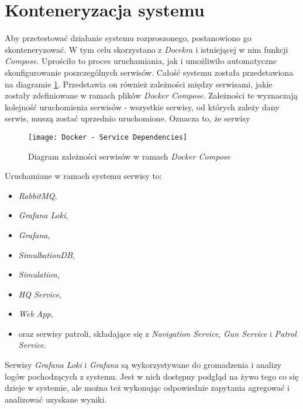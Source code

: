 \section{Konteneryzacja systemu}
\label{sec:konteneryzacjaSystemu}

\par Aby przetestować działanie systemu rozproszonego, postanowiono go skonteneryzować. W tym celu skorzystano z \emph{Docekr}a i istniejącej w nim funkcji \emph{Compose}. Uprościło to proces uruchamiania, jak i umożliwiło automatyczne skonfigurowanie poszczególnych serwisów. Całość systemu została przedstawiona na diagramie \ref{fig:dockerServiceRelations}. Przedstawia on również zależności między serwisami, jakie zostały zdefiniowane w ramach plików \emph{Docker Compose}. Zależności te wyznaczają kolejność uruchomienia serwisów - wszystkie serwisy, od których zależy dany serwis, muszą zostać uprzednio uruchomione. Oznacza to, że serwisy

\begin{figure}
    \centering
    \texttt{[image: Docker - Service Dependencies]}
    \caption{Diagram zależności serwisów w ramach \emph{Docker Compose}}
    \label{fig:dockerServiceRelations}
\end{figure}


\par Uruchamiane w ramach systemu serwisy to:
\begin{itemize}
    \item \emph{RabbitMQ},
    \item \emph{Grafana Loki},
    \item \emph{Grafana},
    \item \emph{SimulbationDB},
    \item \emph{Simulation},
    \item \emph{HQ Service},
    \item \emph{Web App},
    \item oraz serwisy patroli, składające się z \emph{Navigation Service}, \emph{Gun Service} i \emph{Patrol Service}.
\end{itemize}

\par Serwisy \emph{Grafana Loki} i \emph{Grafana} są wykorzystywane do gromadzenia i analizy logów pochodzących z systemu. Jest w nich dostępny podgląd na żywo tego co się dzieje w systemie, ale można też wykonując odpowiednie zapytania agregować i analizować uzyskane wyniki.

